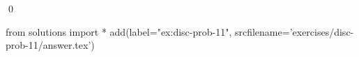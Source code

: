 
\begin{ex} 
  \label{ex:disc-prob-11}
  
  \qed
\end{ex} 
\begin{python0}
from solutions import *
add(label="ex:disc-prob-11",
    srcfilename='exercises/disc-prob-11/answer.tex') 
\end{python0}
